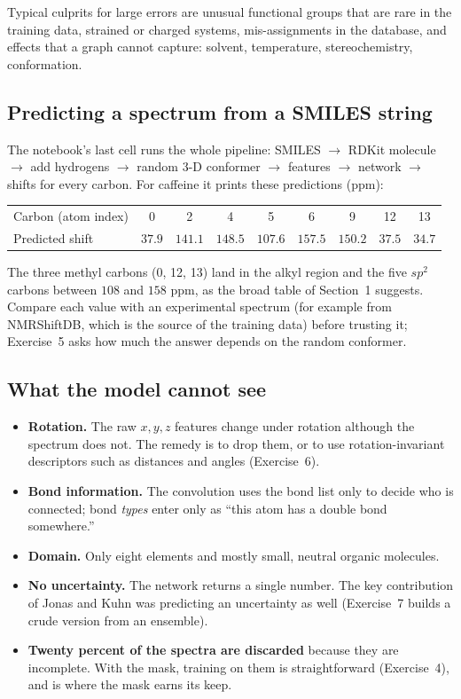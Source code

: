 \documentclass[11pt]{article}
\begin{document}
Typical culprits for large errors are unusual functional groups that are rare in the training data, strained or charged systems, mis-assignments in the database, and effects that a graph cannot capture: solvent, temperature, stereochemistry, conformation.

\subsection*{Predicting a spectrum from a SMILES string}
The notebook's last cell runs the whole pipeline: SMILES $\to$ RDKit molecule $\to$ add hydrogens $\to$ random 3-D conformer $\to$ features $\to$ network $\to$ shifts for every carbon. For caffeine it prints these predictions (ppm):

\begin{center}
\small
\begin{tabular}{@{}lcccccccc@{}}
\toprule
Carbon (atom index) & 0 & 2 & 4 & 5 & 6 & 9 & 12 & 13\\
Predicted shift & $37.9$ & $141.1$ & $148.5$ & $107.6$ & $157.5$ & $150.2$ & $37.5$ & $34.7$\\
\bottomrule
\end{tabular}
\end{center}

The three methyl carbons (0, 12, 13) land in the alkyl region and the five $sp^2$ carbons between $108$ and $158$ ppm, as the broad table of Section~1 suggests. Compare each value with an experimental spectrum (for example from NMRShiftDB, which is the source of the training data) before trusting it; Exercise~5 asks how much the answer depends on the random conformer.

\subsection*{What the model cannot see}
\begin{itemize}[nosep]
  \item \textbf{Rotation.} The raw $x,y,z$ features change under rotation although the spectrum does not. The remedy is to drop them, or to use rotation-invariant descriptors such as distances and angles (Exercise~6).
  \item \textbf{Bond information.} The convolution uses the bond list only to decide who is connected; bond \emph{types} enter only as ``this atom has a double bond somewhere.''
  \item \textbf{Domain.} Only eight elements and mostly small, neutral organic molecules.
  \item \textbf{No uncertainty.} The network returns a single number. The key contribution of Jonas and Kuhn was predicting an uncertainty as well (Exercise~7 builds a crude version from an ensemble).
  \item \textbf{Twenty percent of the spectra are discarded} because they are incomplete. With the mask, training on them is straightforward (Exercise~4), and is where the mask earns its keep.
\end{itemize}
\end{document}
